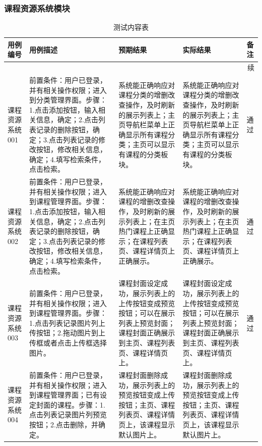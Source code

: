 \documentclass[titlepage,UTF8,linespread=1.5]{ctexart}
\begin{document}
\subsubsection{课程资源系统模块}
\begin{longtable}{|p{4em}|p{14em}|p{7em}|p{7em}|p{2em}|}
    \caption{测试内容表}\label{tab:test_course}  \\\hline
    用例编号    & 用例描述 & 预期结果 & 实际结果 & 备注 \\\hline
    \endfirsthead
    \multicolumn{5}{r}{{续\tablename\thetable{}}}       \\\hline
    \endhead
    课程资源系统001 &
    前置条件：用户已登录，并有相关操作权限；进入到分类管理界面。步骤：1.点击添加按钮，输入相关信息，确定；2.点击列表记录的删除按钮，确定；3.点击列表记录的修改按钮，修改相关信息，确定；4.填写检索条件，点击检索。 &
    系统能正确响应对课程分类的增删改查操作，及时刷新的展示列表上；主页导航栏菜单上正确显示所有课程分类；主页可以显示有课程的分类板块。 &
    系统能正确响应对课程分类的增删改查操作，及时刷新的展示列表上；主页导航栏菜单上正确显示所有课程分类；主页可以显示有课程的分类板块。 &
    通过 \\\hline
    课程资源系统002 &
    前置条件：用户已登录，并有相关操作权限；进入到课程管理界面。步骤：1.点击添加按钮，输入相关信息，确定；2.点击列表记录的删除按钮，确定；3.点击列表记录的修改按钮，修改相关信息，确定；4.填写检索条件，点击检索。 &
    系统能正确响应对课程的增删改查操作，及时刷新的展示列表上；在主页热门课程上正确显示；在课程列表页、课程详情页上正确展示。 &
    系统能正确响应对课程的增删改查操作，及时刷新的展示列表上；在主页热门课程上正确显示；在课程列表页、课程详情页上正确展示。 &
    通过 \\\hline
    课程资源系统003 &
    前置条件：用户已登录，并有相关操作权限；进入到课程管理界面。步骤：1.点击列表记录图片列上传按钮；2.拖动图片到上传框或者点击上传框选择图片。 &
    课程封面设定成功，展示列表上的上传按钮变成预览按钮；可以在展示列表上预览封面；课程封面正确展示到主页、课程列表页、课程详情页上。 &
    课程封面设定成功，展示列表上的上传按钮变成预览按钮；可以在展示列表上预览封面；课程封面正确展示到主页、课程列表页、课程详情页上。 &
    通过 \\\hline
    课程资源系统004 &
    前置条件：用户已登录，并有相关操作权限；进入到课程管理界面；已有设定封面的课程。步骤：1.点击列表记录图片列预览按钮；2.点击删除，并确定。 &
    课程封面删除成功，展示列表上的预览按钮变成上传按钮；主页、课程列表页、课程详情页上，该课程显示默认图片上。&
    课程封面删除成功，展示列表上的预览按钮变成上传按钮；主页、课程列表页、课程详情页上，该课程显示默认图片上。&

\end{longtable}
\end{document}
